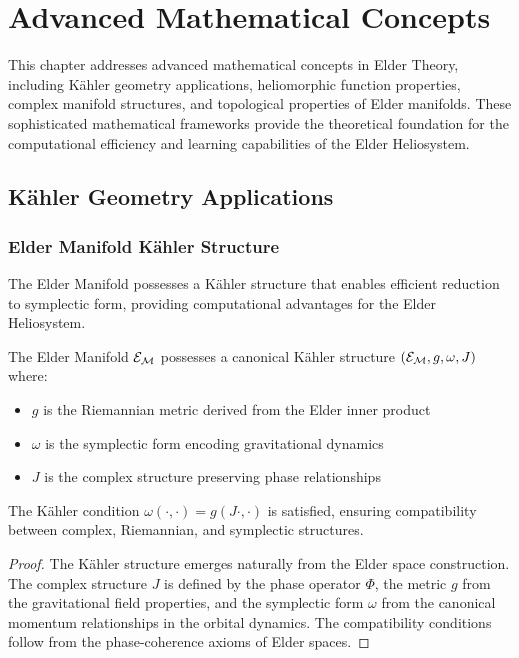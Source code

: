 \chapter{Advanced Mathematical Concepts}

\begin{tcolorbox}[colback=blue!5!white,colframe=blue!75!black,title=\textit{Chapter Summary}]
This chapter addresses advanced mathematical concepts in Elder Theory, including Kähler geometry applications, heliomorphic function properties, complex manifold structures, and topological properties of Elder manifolds. These sophisticated mathematical frameworks provide the theoretical foundation for the computational efficiency and learning capabilities of the Elder Heliosystem.
\end{tcolorbox}

\section{Kähler Geometry Applications}

\subsection{Elder Manifold Kähler Structure}

The Elder Manifold possesses a Kähler structure that enables efficient reduction to symplectic form, providing computational advantages for the Elder Heliosystem.

\begin{theorem}
\label{thm:elder_kahler_structure}
The Elder Manifold $\mathcal{E}_{\mathcal{M}}$ possesses a canonical Kähler structure $(\mathcal{E}_{\mathcal{M}}, g, \omega, J)$ where:
\begin{itemize}
    \item $g$ is the Riemannian metric derived from the Elder inner product
    \item $\omega$ is the symplectic form encoding gravitational dynamics
    \item $J$ is the complex structure preserving phase relationships
\end{itemize}

The Kähler condition $\omega(\cdot, \cdot) = g(J \cdot, \cdot)$ is satisfied, ensuring compatibility between complex, Riemannian, and symplectic structures.
\end{theorem}

\begin{proof}
The Kähler structure emerges naturally from the Elder space construction. The complex structure $J$ is defined by the phase operator $\Phi$, the metric $g$ from the gravitational field properties, and the symplectic form $\omega$ from the canonical momentum relationships in the orbital dynamics. The compatibility conditions follow from the phase-coherence axioms of Elder spaces.
\end{proof}

